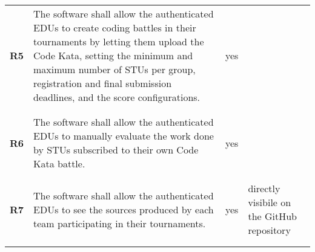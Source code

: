 \begin{longtable}[H]{l p{6.5cm} l p{3cm}}
    \textbf{R5}  & The software shall allow the authenticated EDUs to create coding battles in their tournaments by letting them upload the Code Kata, setting the minimum and maximum number of STUs per group, registration and final submission deadlines, and the score configurations. & {\color{green}yes}   &                                                                                         \\
                 &                                                                                                                                                                                                                                                                          &                      &                                                                                         \\\hline & & & \\
    \textbf{R6}  & The software shall allow the authenticated EDUs to manually evaluate the work done by STUs subscribed to their own Code Kata battle.                                                                                                                                     & {\color{green}yes}   &                                                                                         \\
                 &                                                                                                                                                                                                                                                                          &                      &                                                                                         \\\hline & & & \\
    \textbf{R7}  & The software shall allow the authenticated EDUs to see the sources produced by each team participating in their tournaments.                                                                                                                                             & {\color{green}yes}   & directly visibile on the GitHub repository                                              \\
                 &                                                                                                                                                                                                                                                                          &                      &                                                                                         \\\hline & & & \\

\end{longtable}
